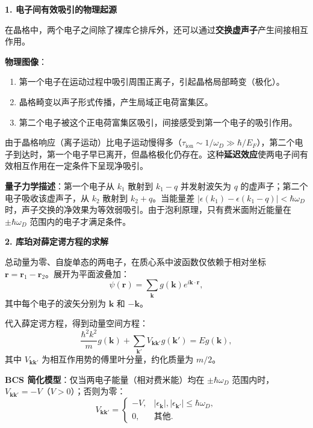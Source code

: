 \begin{derivationbox}[标准解题过程]
\textbf{1. 电子间有效吸引的物理起源}

在晶格中，两个电子之间除了裸库仑排斥外，还可以通过\textbf{交换虚声子}产生间接相互作用。

\textbf{物理图像}：
\begin{enumerate}
    \item 第一个电子在运动过程中吸引周围正离子，引起晶格局部畸变（极化）。
    \item 晶格畸变以声子形式传播，产生局域正电荷富集区。
    \item 第二个电子被这个正电荷富集区吸引，间接感受到第一个电子的吸引作用。
\end{enumerate}

由于晶格响应（离子运动）比电子运动慢得多（$\tau_{\text{ion}}\sim1/\omega_D\gg\hbar/E_F$），第二个电子到达时，第一个电子早已离开，但晶格极化仍存在。这种\textbf{延迟效应}使两电子间有效相互作用在一定条件下呈现净吸引。

\textbf{量子力学描述}：第一个电子从 $k_1$ 散射到 $k_1-q$ 并发射波矢为 $q$ 的虚声子；第二个电子吸收该虚声子，从 $k_2$ 散射到 $k_2+q$。当能量差 $|\epsilon(k_1)-\epsilon(k_1-q)|<\hbar\omega_D$ 时，声子交换的净效果为等效弱吸引。由于泡利原理，只有费米面附近能量在 $\pm\hbar\omega_D$ 范围内的电子才满足条件。

\textbf{2. 库珀对薛定谔方程的求解}

总动量为零、自旋单态的两电子，在质心系中波函数仅依赖于相对坐标 $\bm{r}=\bm{r}_1-\bm{r}_2$。展开为平面波叠加：
\begin{equation}
\psi(\bm{r})=\sum_{\bm{k}}g(\bm{k})e^{i\bm{k}\cdot\bm{r}},
\end{equation}
其中每个电子的波矢分别为 $\bm{k}$ 和 $-\bm{k}$。

代入薛定谔方程，得到动量空间方程：
\begin{equation}
\frac{\hbar^2k^2}{m}g(\bm{k})+\sum_{\bm{k}'}V_{\bm{k}\bm{k}'}g(\bm{k}')=Eg(\bm{k}),
\end{equation}
其中 $V_{\bm{k}\bm{k}'}$ 为相互作用势的傅里叶分量，约化质量为 $m/2$。

\textbf{BCS 简化模型}：仅当两电子能量（相对费米能）均在 $\pm\hbar\omega_D$ 范围内时，$V_{\bm{k}\bm{k}'}=-V$（$V>0$）；否则为零：
\begin{equation}
V_{\bm{k}\bm{k}'}=
\begin{cases}
-V, & |\epsilon_{\bm{k}}|,|\epsilon_{\bm{k}'}|\le\hbar\omega_D,\\
0, & \text{其他}.
\end{cases}
\end{equation}


\end{derivationbox}
